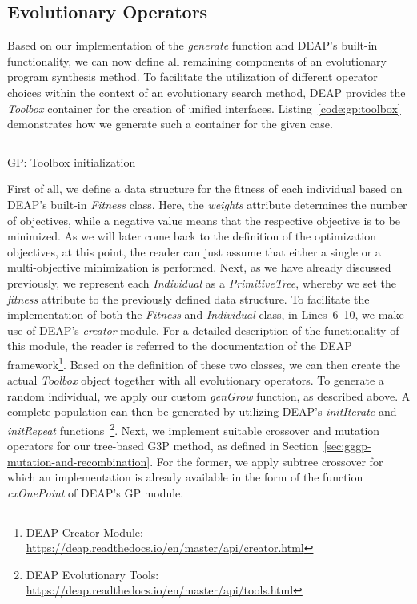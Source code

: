 \subsection{Evolutionary Operators}
Based on our implementation of the \emph{generate} function and DEAP's built-in functionality, we can now define all remaining components of an evolutionary program synthesis method.
To facilitate the utilization of different operator choices within the context of an evolutionary search method, DEAP provides the \emph{Toolbox} container for the creation of unified interfaces.
Listing~\ref{code:gp:toolbox} demonstrates how we generate such a container for the given case.
\begin{listing}
	\inputminted[linenos]{python}{evostencils/gp/toolbox.py}
	\caption{GP: Toolbox initialization}
	\label{code:gp:toolbox}
\end{listing}
First of all, we define a data structure for the fitness of each individual based on DEAP's built-in \emph{Fitness} class.
Here, the \emph{weights} attribute determines the number of objectives, while a negative value means that the respective objective is to be minimized.
As we will later come back to the definition of the optimization objectives, at this point, the reader can just assume that either a single or a multi-objective minimization is performed.
Next, as we have already discussed previously, we represent each \emph{Individual} as a \emph{PrimitiveTree}, whereby we set the \emph{fitness} attribute to the previously defined data structure.
To facilitate the implementation of both the \emph{Fitness} and \emph{Individual} class, in Lines~6--10, we make use of DEAP's \emph{creator} module.
For a detailed description of the functionality of this module, the reader is referred to the documentation of the DEAP framework\footnote{DEAP Creator Module: \url{https://deap.readthedocs.io/en/master/api/creator.html}}.
Based on the definition of these two classes, we can then create the actual \emph{Toolbox} object together with all evolutionary operators.
To generate a random individual, we apply our custom \emph{genGrow} function, as described above.
A complete population can then be generated by utilizing DEAP's \emph{initIterate} and \emph{initRepeat} functions~\footnote{DEAP Evolutionary Tools: \url{https://deap.readthedocs.io/en/master/api/tools.html}}.
Next, we implement suitable crossover and mutation operators for our tree-based G3P method, as defined in Section~\ref{sec:gggp-mutation-and-recombination}.
For the former, we apply subtree crossover for which an implementation is already available in the form of the function \emph{cxOnePoint} of DEAP's GP module.
